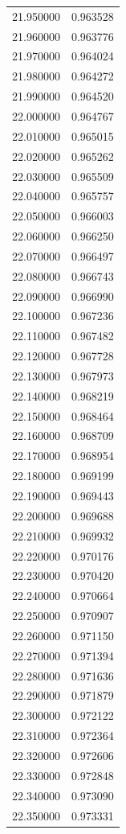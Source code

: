 \begin{tabular}{rr}
21.950000 & 0.963528 \\
21.960000 & 0.963776 \\
21.970000 & 0.964024 \\
21.980000 & 0.964272 \\
21.990000 & 0.964520 \\
22.000000 & 0.964767 \\
22.010000 & 0.965015 \\
22.020000 & 0.965262 \\
22.030000 & 0.965509 \\
22.040000 & 0.965757 \\
22.050000 & 0.966003 \\
22.060000 & 0.966250 \\
22.070000 & 0.966497 \\
22.080000 & 0.966743 \\
22.090000 & 0.966990 \\
22.100000 & 0.967236 \\
22.110000 & 0.967482 \\
22.120000 & 0.967728 \\
22.130000 & 0.967973 \\
22.140000 & 0.968219 \\
22.150000 & 0.968464 \\
22.160000 & 0.968709 \\
22.170000 & 0.968954 \\
22.180000 & 0.969199 \\
22.190000 & 0.969443 \\
22.200000 & 0.969688 \\
22.210000 & 0.969932 \\
22.220000 & 0.970176 \\
22.230000 & 0.970420 \\
22.240000 & 0.970664 \\
22.250000 & 0.970907 \\
22.260000 & 0.971150 \\
22.270000 & 0.971394 \\
22.280000 & 0.971636 \\
22.290000 & 0.971879 \\
22.300000 & 0.972122 \\
22.310000 & 0.972364 \\
22.320000 & 0.972606 \\
22.330000 & 0.972848 \\
22.340000 & 0.973090 \\
22.350000 & 0.973331 \\

\end{tabular}
